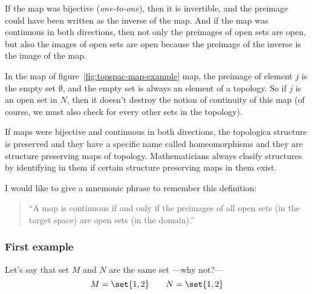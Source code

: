   If the map was bijective (\emph{one-to-one}), then it is invertible, and the preimage could
  have been written as the inverse of the map. And if the map was continuous in both directions,
  then not only the preimages of open sets are open, but also the images of open sets are open
  because the preimage of the inverse is the image of the map.

  In the map of figure~\ref{fig:topspac-map-example} map, the preimage of element $j$\/ is the
  empty set $\emptyset$, and the empty set is always an element of a topology. So if $j$\/ is an
  open set in $N$, then it doesn't destroy the notion of continuity of this map (of course, we must
  also check for every other sets in the topology).

  If maps were bijective and continuous in both directions, the topologica structure is preserved
  and they have a specific name called homeomorphisms and they are structure preserving maps of
  topology. Mathematicians always clasify structures by identifying in them if certain structure
  preserving maps in them exist.

  I would like to give a mnemonic phrase to remember this definition:
  \begin{quote}
  ``A map is continuous if and only if the preimages of all open sets (in the target space) are open sets
  (in the domain).''
  \end{quote}
 
  \subsubsection{First example}
  Let's say that set $M$ and $N$ are the same set ---why not?---
  \[
    M = \set{1, 2}
    \hspace{2em}
    N = \set{1,2}
  \]

